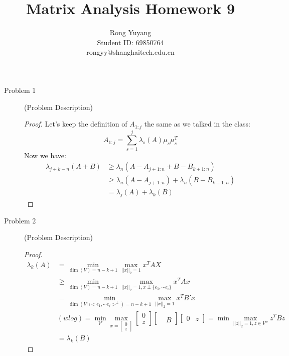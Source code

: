 \documentclass{article}
\title{Matrix Analysis Homework 9}
\author{Rong Yuyang \\ Student ID: 69850764 \\ rongyy@shanghaitech.edu.cn}
\begin{document}
\maketitle

\begin{description}
	\item[Problem 1] (Problem Description)
	\begin{proof}
		Let's keep the definition of $A_{1:j}$ the same as we talked in the class:
		$$ A_{1:j} = \sum_{s = 1}^{j}\lambda_s(A)\mu_s\mu_s^T$$
		Now we have:
		\begin{equation}\begin{aligned}
			\lambda_{j+k-n}(A+B)
			& \geq \lambda_{n}(A-A_{j+1:n} + B-B_{k+1:n}) \\
			& \geq \lambda_{n}(A-A_{j+1:n}) + \lambda_{n}(B-B_{k+1:n}) \\
			&   =  \lambda_{j}(A) + \lambda_{k}(B)
		\end{aligned}\end{equation}
	\end{proof}

	\item[Problem 2] (Problem Description)
	\begin{proof}
		\begin{equation}\begin{aligned}
			\lambda_k(A)
			& = \min_{\dim(V) = n-k+1} \max_{||x||_2 =1} x^TAX  \\
			& \geq \min_{\dim(V) = n-k+1} \max_{||x||_2 = 1, x \perp \{e_{1}, \cdots e_{i}\}} x^TAx \\
			& = \min_{\dim(V\cap<e_{1}, \cdots e_{i}>^\perp) = n-k+1} \max_{||x||_2 = 1} x^TB'x \\
			& (wlog) = \min_{V'} \max_{x = \begin{bmatrix}0 \\ z\end{bmatrix}} \begin{bmatrix}0 \\ z\end{bmatrix}\begin{bmatrix} &  \\  & B\end{bmatrix}\begin{bmatrix}0 & z\end{bmatrix}
			= \min \max_{||z||_2 = 1, z\in V''} z^TBz \\
			& = \lambda_k(B)
		\end{aligned}\end{equation}
	\end{proof}


\end{description}
\end{document}
